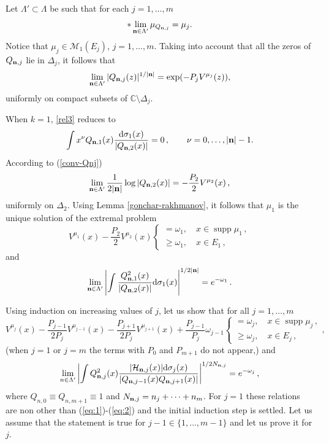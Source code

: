 \documentclass{amsart}
\theoremstyle{definition}
\theoremstyle{remark}
\newcommand{\supp}{\operatorname{supp }}
\begin{document}
\medskip

Let
$\Lambda' \subset \Lambda$ be  such
that for each $j=1,\ldots,m$
\[
*\lim_{{\bf n}\in\Lambda'}\mu_{Q_{{\bf n},j}}=\mu_j.
\]
Notice that $\mu_j\in\mathcal{M}_1(E_j)$, $j=1,\ldots,m$. Taking into account that all the zeros of $Q_{{\bf n},j}$ lie in $\Delta_j$, it follows that
\begin{equation}\label{conv-Qnj}
\lim_{{\bf n}\in\Lambda'}|Q_{{\bf n},j}(z)|^{1/|{\bf n}|}=\exp(- P_jV^{\mu_j}(z)),
\end{equation}
uniformly on compact subsets of $\mathbb{C} \setminus\Delta_j$.

\medskip

When $k=1$, \eqref{rel3} reduces to
\[ \int x^{\nu} Q_{{\bf n},1}(x) \frac{{\rm d} \sigma_{1}(x)}{|Q_{{\bf
n},2}(x)|} = 0\,, \qquad \nu=0,\ldots,|{\bf n}|-1.
\]
According to (\ref{conv-Qnj})
\[ \lim_{{\bf n} \in \Lambda'} \frac{1}{2|{\bf n}|}\log|Q_{{\bf n},2}(x)| =
-\frac{P_2}{2 } V^{\mu_{2}}(x)\,,
\]
uniformly on $\Delta_{2}$. Using Lemma \ref{gonchar-rakhmanov},
it follows that $\mu_{1}$ is the unique solution of the extremal
problem
\begin{equation} \label{eq:1}
V^{\mu_{1}}(x) - \frac{P_2}{2}V^{\mu_{2}}(x)
\left\{
\begin{array}{l} = \omega_{1},\quad x
\in \supp {\mu_{1}} \,, \\
\geq \omega_{1}, \quad x \in E_{1} \,,
\end{array} \right.
\end{equation}
and
\begin{equation} \label{eq:2}
\lim_{{\bf n} \in \Lambda'} \left|\int \frac{Q_{{\bf n},1}^2(x)}{|Q_{{\bf n},2}(x)|}{\rm d}\sigma_{1}(x)\right|^{1/2|{\bf n}|} =
e^{-\omega_{1}}\,.
\end{equation}

Using induction on increasing values of $j$, let us show that for all
$j = 1,\ldots,m$
\begin{equation} \label{eq:3*}
V^{\mu_j}(x) - \frac{P_{j-1}}{2 P_j}V^{\mu_{j-1}}(x) -
\frac{P_{j+1}}{2 P_j}V^{\mu_{j+1}}(x) +
 \frac{P_{j-1}}{P_j}\omega_{j-1} \left\{
\begin{array}{l} = \omega_j,\quad x
\in \supp{\mu_j} \,, \\
\geq \omega_j, \quad x \in E_j \,,
\end{array} \right.,
\end{equation}
(when $j=1$ or $j=m$ the terms with $P_0$ and $P_{m+1}$ do not appear,)    and
\begin{equation} \label{eq:4**}
\lim_{n \in \Lambda'} \left|\int  {Q_{{\bf n},j}^2(x)} \frac{|\mathcal{H}_{{\bf n},j}(x)| {\rm d}\sigma_j(x)}{|Q_{{\bf n},j-1}(x)Q_{{\bf n},j+1}(x)|} \right|^{1/2N_{{\bf n},j}} = e^{-\omega_j}\,,
\end{equation}
where $Q_{n,0} \equiv Q_{n,m+1} \equiv 1$ and $N_{{\bf n},j} = n_j + \cdots + n_m$. For $j = 1$ these relations
are non other than (\ref{eq:1})-(\ref{eq:2}) and the initial
induction step is settled. Let us assume that the statement is
true for $j -1\in \{1,\ldots,m-1\}$ and let us prove it for
$j$.
\end{document}
